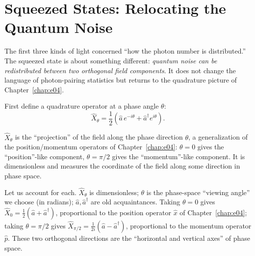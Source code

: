 \section{Squeezed States: Relocating the Quantum Noise}
\label{sec:e06-squeezed}

The first three kinds of light concerned ``how the photon number is distributed.'' The squeezed state is about something different: \emph{quantum noise can be redistributed between two orthogonal field components}. It does not change the language of photon-pairing statistics but returns to the quadrature picture of Chapter~\ref{chap:e04}.

First define a quadrature operator at a phase angle \(\theta\):
\begin{equation}
  \hat X_\theta=\frac{1}{2}\left(\hat a\,e^{-i\theta}+\hat a^{\dagger}e^{i\theta}\right).
  \label{eq:e06-quadrature}
\end{equation}
\begin{formulaexplain}
\(\hat X_\theta\) is the ``projection'' of the field along the phase direction \(\theta\), a generalization of the position/momentum operators of Chapter~\ref{chap:e04}: \(\theta=0\) gives the ``position''-like component, \(\theta=\pi/2\) gives the ``momentum''-like component. It is dimensionless and measures the coordinate of the field along some direction in phase space.
\end{formulaexplain}

Let us account for each. \(\hat X_\theta\) is dimensionless; \(\theta\) is the phase-space ``viewing angle'' we choose (in radians); \(\hat a,\hat a^\dagger\) are old acquaintances. Taking \(\theta=0\) gives \(\hat X_0=\tfrac12(\hat a+\hat a^\dagger)\), proportional to the position operator \(\hat x\) of Chapter~\ref{chap:e04}; taking \(\theta=\pi/2\) gives \(\hat X_{\pi/2}=\tfrac{1}{2i}(\hat a-\hat a^\dagger)\), proportional to the momentum operator \(\hat p\). These two orthogonal directions are the ``horizontal and vertical axes'' of phase space.

